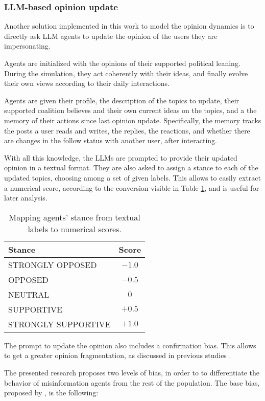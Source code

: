 \subsubsection{LLM-based opinion update}
Another solution implemented in this work to model the opinion dynamics is to directly ask LLM agents to update the opinion of the users they are impersonating.

Agents are initialized with the opinions of their supported political leaning. During the simulation, they act coherently with their ideas, and finally evolve their own views according to their daily interactions.

Agents are given their profile, the description of the topics to update, their supported coalition believes and their own current ideas on the topics, and a the memory of their actions since last opinion update.
Specifically, the memory tracks the posts a user reads and writes, the replies, the reactions, and whether there are changes in the follow status with another user, after interacting. 

With all this knowledge, the LLMs are prompted to provide their updated opinion in a textual format.
They are also asked to assign a stance to each of the updated topics, choosing among a set of given labels. This allows to easily extract a numerical score, according to the conversion visible in Table \ref{tab:stance}, and is useful for later analysis.

\begin{table}[h]
\centering
\begin{tabular}{|l|c|}
\hline
\textbf{Stance} & \textbf{Score} \\
\hline
STRONGLY OPPOSED   & $-1.0$ \\
OPPOSED            & $-0.5$ \\
NEUTRAL            & $0$ \\
SUPPORTIVE         & $+0.5$ \\
STRONGLY SUPPORTIVE & $+1.0$ \\
\hline
\end{tabular}
\caption{Mapping agents' stance from textual labels to numerical scores.}
\label{tab:stance}
\end{table}

\medskip
The prompt to update the opinion also includes a confirmation bias. This allows to get a greater opinion fragmentation, as discussed in previous studies \cite{chuang2024simulatingopiniondynamicsnetworks}.

The presented research proposes two levels of bias, in order to to differentiate the behavior of misinformation agents from the rest of the population.
The base bias, proposed by \cite{Liu_2024}, is the following:

